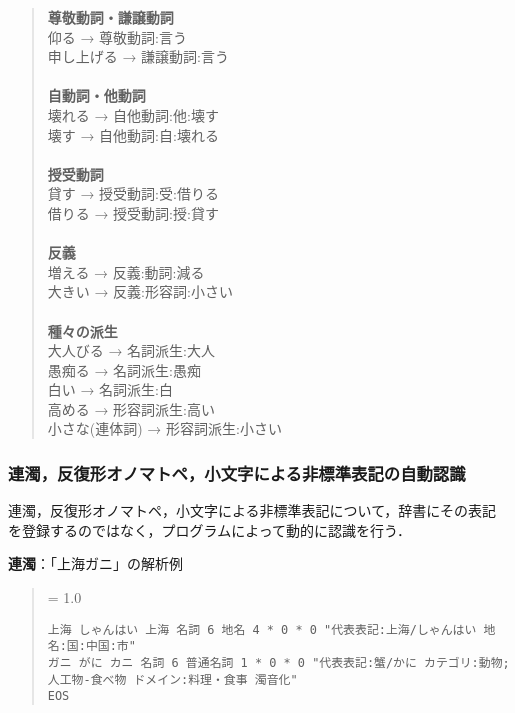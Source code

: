 \documentclass[a4j,titlepage]{jarticle}
\begin{document}
\begin{quote}
{\bf 尊敬動詞・謙譲動詞} \\
仰る → 尊敬動詞:言う \\
申し上げる → 謙譲動詞:言う \\
 \\
{\bf 自動詞・他動詞} \\
壊れる → 自他動詞:他:壊す \\
壊す → 自他動詞:自:壊れる \\
 \\
{\bf 授受動詞} \\
貸す → 授受動詞:受:借りる \\
借りる → 授受動詞:授:貸す \\
 \\
{\bf 反義} \\
増える → 反義:動詞:減る \\
大きい → 反義:形容詞:小さい \\
 \\
{\bf 種々の派生} \\
大人びる → 名詞派生:大人 \\
愚痴る → 名詞派生:愚痴 \\
白い → 名詞派生:白 \\
高める → 形容詞派生:高い \\
小さな(連体詞) → 形容詞派生:小さい \\
\end{quote}


\subsubsection{連濁，反復形オノマトペ，小文字による非標準表記の自動認識}

連濁，反復形オノマトペ，小文字による非標準表記について，辞書にその表記
を登録するのではなく，プログラムによって動的に認識を行う．

\noindent
{\bf 連濁}：「上海ガニ」の解析例
\begin{quote}
{\baselineskip = 1.0 \baselineskip
\begin{verbatim}
上海 しゃんはい 上海 名詞 6 地名 4 * 0 * 0 "代表表記:上海/しゃんはい 地名:国:中国:市"
ガニ がに カニ 名詞 6 普通名詞 1 * 0 * 0 "代表表記:蟹/かに カテゴリ:動物;人工物-食べ物 ドメイン:料理・食事 濁音化"
EOS
\end{verbatim}
}
\end{quote}
\end{document}
